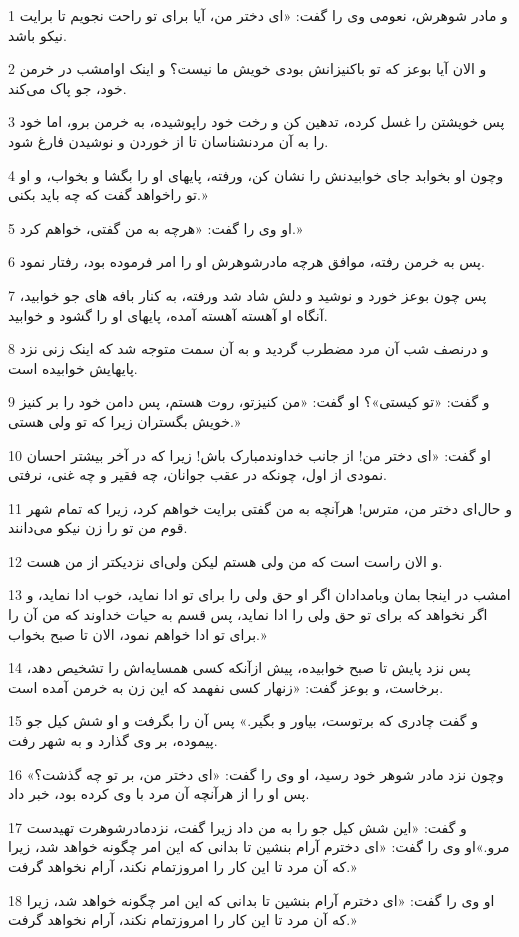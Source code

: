 \par 1 و مادر شوهرش، نعومی وی را گفت: «ای دختر من، آیا برای تو راحت نجویم تا برایت نیکو باشد.
\par 2 و الان آیا بوعز که تو باکنیزانش بودی خویش ما نیست؟ و اینک اوامشب در خرمن خود، جو پاک می‌کند.
\par 3 پس خویشتن را غسل کرده، تدهین کن و رخت خود راپوشیده، به خرمن برو، اما خود را به آن مردنشناسان تا از خوردن و نوشیدن فارغ شود.
\par 4 وچون او بخوابد جای خوابیدنش را نشان کن، ورفته، پایهای او را بگشا و بخواب، و او تو راخواهد گفت که چه باید بکنی.»
\par 5 او وی را گفت: «هر‌چه به من گفتی، خواهم کرد.»
\par 6 پس به خرمن رفته، موافق هر‌چه مادرشوهرش او را امر فرموده بود، رفتار نمود.
\par 7 پس چون بوعز خورد و نوشید و دلش شاد شد ورفته، به کنار بافه های جو خوابید، آنگاه او آهسته آهسته آمده، پایهای او را گشود و خوابید.
\par 8 و درنصف شب آن مرد مضطرب گردید و به آن سمت متوجه شد که اینک زنی نزد پایهایش خوابیده است.
\par 9 و گفت: «تو کیستی»؟ او گفت: «من کنیزتو، روت هستم، پس دامن خود را بر کنیز خویش بگستران زیرا که تو ولی هستی.»
\par 10 او گفت: «ای دختر من! از جانب خداوندمبارک باش! زیرا که در آخر بیشتر احسان نمودی از اول، چونکه در عقب جوانان، چه فقیر و چه غنی، نرفتی.
\par 11 و حال‌ای دختر من، مترس! هرآنچه به من گفتی برایت خواهم کرد، زیرا که تمام شهر قوم من تو را زن نیکو می‌دانند.
\par 12 و الان راست است که من ولی هستم لیکن ولی‌ای نزدیکتر از من هست.
\par 13 امشب در اینجا بمان وبامدادان اگر او حق ولی را برای تو ادا نماید، خوب ادا نماید، و اگر نخواهد که برای تو حق ولی را ادا نماید، پس قسم به حیات خداوند که من آن را برای تو ادا خواهم نمود، الان تا صبح بخواب.»
\par 14 پس نزد پایش تا صبح خوابیده، پیش ازآنکه کسی همسایه‌اش را تشخیص دهد، برخاست، و بوعز گفت: «زنهار کسی نفهمد که این زن به خرمن آمده است.
\par 15 و گفت چادری که برتوست، بیاور و بگیر.» پس آن را بگرفت و او شش کیل جو پیموده، بر وی گذارد و به شهر رفت.
\par 16 وچون نزد مادر شوهر خود رسید، او وی را گفت: «ای دختر من، بر تو چه گذشت؟» پس او را از هرآنچه آن مرد با وی کرده بود، خبر داد.
\par 17 و گفت: «این شش کیل جو را به من داد زیرا گفت، نزدمادرشوهرت تهیدست مرو.»او وی را گفت: «ای دخترم آرام بنشین تا بدانی که این امر چگونه خواهد شد، زیرا که آن مرد تا این کار را امروزتمام نکند، آرام نخواهد گرفت.»
\par 18 او وی را گفت: «ای دخترم آرام بنشین تا بدانی که این امر چگونه خواهد شد، زیرا که آن مرد تا این کار را امروزتمام نکند، آرام نخواهد گرفت.»
 
